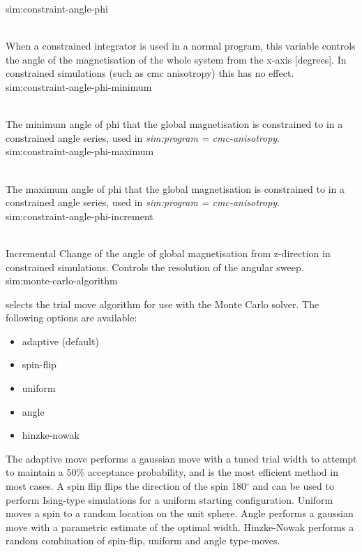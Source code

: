 {\zicf sim:constraint-angle-phi}\\
    When a constrained integrator is used in a normal program, this variable controls the angle of the magnetisation of the whole system from the x-axis [degrees]. In constrained simulations (such as cmc anisotropy) this has no effect.\\
{\zicf sim:constraint-angle-phi-minimum}\\
    The minimum angle of phi that the global magnetisation is constrained to in a constrained angle series, used in \textit{sim:program = cmc-anisotropy}.\\
{\zicf sim:constraint-angle-phi-maximum}\\
    The maximum angle of phi that the global magnetisation is constrained to in a constrained angle series, used in \textit{sim:program = cmc-anisotropy}.\\
{\zicf sim:constraint-angle-phi-increment}\\
    Incremental Change of the angle of global magnetisation from z-direction in constrained simulations. Controls the resolution of the angular sweep.\\
{\zicf sim:monte-carlo-algorithm} selects the trial move algorithm for use with the Monte Carlo solver. The following options are available:
\begin{itemize}
  \item[] adaptive (default)
  \item[] spin-flip
  \item[] uniform
  \item[] angle
  \item[] hinzke-nowak
\end{itemize}
The adaptive move performs a gaussian move with a tuned trial width to attempt to maintain a 50\% acceptance probability, and is the most efficient method in most cases. A spin flip flips the direction of the spin 180$^{\circ}$ and can be used to perform Ising-type simulations for a uniform starting configuration. Uniform moves a spin to a random location on the unit sphere. Angle performs a gaussian move with a parametric estimate of the optimal width. Hinzke-Nowak performs a random combination of spin-flip, uniform and angle type-moves.\\

